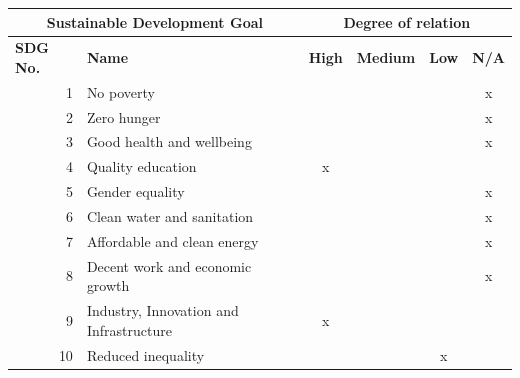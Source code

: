 \endgroup


\vspace{2cm}

\begin{table}[p]
    \small
    \centering
    \renewcommand{\arraystretch}{1.5}
    
    \begin{tabular}{|rp{7.15cm}|cccc|}
        \hline
        \multicolumn{2}{|c|}{\textbf{Sustainable Development Goal}} & \multicolumn{4}{c|}{\textbf{Degree of relation}} \\ \hline
        \multicolumn{1}{|l|}{\textbf{SDG No.}} & \textbf{Name} & \multicolumn{1}{c|}{\textbf{High}} & \multicolumn{1}{c|}{\textbf{Medium}} & \multicolumn{1}{c|}{\textbf{Low}} & \multicolumn{1}{c|}{\textbf{N/A}} \\ \hline\hline
        \multicolumn{1}{|r|}{1} & No poverty & \multicolumn{1}{c|}{} & \multicolumn{1}{c|}{} & \multicolumn{1}{c|}{} & x \\ \hline
        \multicolumn{1}{|r|}{2} & Zero hunger & \multicolumn{1}{c|}{} & \multicolumn{1}{c|}{} & \multicolumn{1}{c|}{} & x \\ \hline
        \multicolumn{1}{|r|}{3} & Good health and wellbeing & \multicolumn{1}{c|}{} & \multicolumn{1}{c|}{} & \multicolumn{1}{c|}{} & x \\ \hline
        \multicolumn{1}{|r|}{4} & Quality education & \multicolumn{1}{c|}{x} & \multicolumn{1}{c|}{} & \multicolumn{1}{c|}{} &  \\ \hline
        \multicolumn{1}{|r|}{5} & Gender equality & \multicolumn{1}{c|}{} & \multicolumn{1}{c|}{} & \multicolumn{1}{c|}{} & x \\ \hline
        \multicolumn{1}{|r|}{6} & Clean water and sanitation & \multicolumn{1}{c|}{} & \multicolumn{1}{c|}{} & \multicolumn{1}{c|}{} & x \\ \hline
        \multicolumn{1}{|r|}{7} & Affordable and clean energy & \multicolumn{1}{c|}{} & \multicolumn{1}{c|}{} & \multicolumn{1}{c|}{} & x \\ \hline
        \multicolumn{1}{|r|}{8} & Decent work and economic growth & \multicolumn{1}{c|}{} & \multicolumn{1}{c|}{} & \multicolumn{1}{c|}{} & x \\ \hline
        \multicolumn{1}{|r|}{9} & Industry, Innovation and Infrastructure & \multicolumn{1}{c|}{x} & \multicolumn{1}{c|}{} & \multicolumn{1}{c|}{} &  \\ \hline
        \multicolumn{1}{|r|}{10} & Reduced inequality & \multicolumn{1}{c|}{} & \multicolumn{1}{c|}{} & \multicolumn{1}{c|}{x} &  \\ \hline

\end{tabular}
\end{table}
